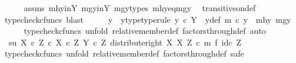 \begin{isabellebody}
\ \ \ \ \isamarkupfalse%
\ assms\ mhy{\isacharunderscore}{\kern0pt}in{\isacharunderscore}{\kern0pt}Y\ mgy{\isacharunderscore}{\kern0pt}in{\isacharunderscore}{\kern0pt}Y\ mgy{\isacharunderscore}{\kern0pt}types\ mhy{}{\isacharunderscore}{\kern0pt}eq{\isacharunderscore}{\kern0pt}mgy{}\ \isamarkupfalse%
\ transitive{\isacharunderscore}{\kern0pt}on{\isacharunderscore}{\kern0pt}def\isanewline
\ \ \ \ \isamarkupfalse%
\ {\isacharparenleft}{\kern0pt}typecheck{\isacharunderscore}{\kern0pt}cfuncs{\isacharcomma}{\kern0pt}\ blast{\isacharparenright}{\kern0pt}\isanewline
\ \ \isamarkupfalse%
\ \isamarkupfalse%
\ y\ \ y{\isacharunderscore}{\kern0pt}type{\isacharbrackleft}{\kern0pt}type{\isacharunderscore}{\kern0pt}rule{\isacharbrackright}{\kern0pt}{\isacharcolon}{\kern0pt}\ {\isachardoublequoteopen}y\ {\isasymin}\isactrlsub c\ Y{\isachardoublequoteclose}\ \ y{\isacharunderscore}{\kern0pt}def{\isacharcolon}{\kern0pt}\ {\isachardoublequoteopen}m\ {\isasymcirc}\isactrlsub c\ y\ {\isacharequal}{\kern0pt}\ {\isasymlangle}mhy{}{\isacharcomma}{\kern0pt}\ mgy{}{\isasymrangle}{\isachardoublequoteclose}\isanewline
\ \ \ \ \isamarkupfalse%
\ {\isacharparenleft}{\kern0pt}typecheck{\isacharunderscore}{\kern0pt}cfuncs{\isacharcomma}{\kern0pt}\ unfold\ relative{\isacharunderscore}{\kern0pt}member{\isacharunderscore}{\kern0pt}def{}\ factors{\isacharunderscore}{\kern0pt}through{\isacharunderscore}{\kern0pt}def{}{\isacharcomma}{\kern0pt}\ auto{\isacharparenright}{\kern0pt}\isanewline
\isanewline
\ \ \isamarkupfalse%
\ {\isachardoublequoteopen}\ {\isasymlangle}s{\isacharcomma}{\kern0pt}u{\isasymrangle}\ {\isasymin}\isactrlbsub {\isacharparenleft}{\kern0pt}X\ {\isasymtimes}\isactrlsub c\ Z{\isacharparenright}{\kern0pt}\ {\isasymtimes}\isactrlsub c\ X\ {\isasymtimes}\isactrlsub c\ Z\isactrlesub \ {\isacharparenleft}{\kern0pt}Y\ {\isasymtimes}\isactrlsub c\ Z{\isacharcomma}{\kern0pt}\ distribute{\isacharunderscore}{\kern0pt}right\ X\ X\ Z\ {\isasymcirc}\isactrlsub c\ {\isacharparenleft}{\kern0pt}m\ {\isasymtimes}\isactrlsub f\ id\isactrlsub c\ Z{\isacharparenright}{\kern0pt}{\isacharparenright}{\kern0pt}{\isachardoublequoteclose}\ \isanewline
\ \ \isamarkupfalse%
\ {\isacharparenleft}{\kern0pt}typecheck{\isacharunderscore}{\kern0pt}cfuncs{\isacharcomma}{\kern0pt}\ unfold\ relative{\isacharunderscore}{\kern0pt}member{\isacharunderscore}{\kern0pt}def{}\ factors{\isacharunderscore}{\kern0pt}through{\isacharunderscore}{\kern0pt}def{}{\isacharcomma}{\kern0pt}\ safe{\isacharparenright}{\kern0pt}\isanewline

\end{isabellebody}
